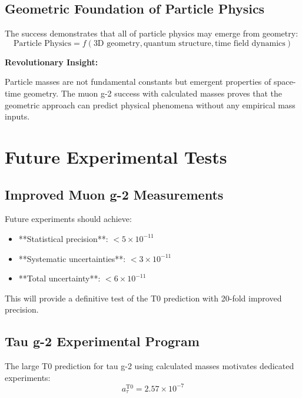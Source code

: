 \documentclass[12pt,a4paper]{article}
\numberwithin{equation}{section}
\begin{document}
	\subsection{Geometric Foundation of Particle Physics}
	
	The success demonstrates that all of particle physics may emerge from geometry:
	\begin{equation}
		\text{Particle Physics} = f(\text{3D geometry}, \text{quantum structure}, \text{time field dynamics})
	\end{equation}
	
	\begin{t0important}
		\textbf{Revolutionary Insight:}
		
		Particle masses are not fundamental constants but emergent properties of space-time geometry. The muon g-2 success with calculated masses proves that the geometric approach can predict physical phenomena without any empirical mass inputs.
	\end{t0important}
	
	\section{Future Experimental Tests}
	
	\subsection{Improved Muon g-2 Measurements}
	
	Future experiments should achieve:
	\begin{itemize}
		\item **Statistical precision**: $< 5 \times 10^{-11}$
		\item **Systematic uncertainties**: $< 3 \times 10^{-11}$
		\item **Total uncertainty**: $< 6 \times 10^{-11}$
	\end{itemize}
	
	This will provide a definitive test of the T0 prediction with 20-fold improved precision.
	
	\subsection{Tau g-2 Experimental Program}
	
	The large T0 prediction for tau g-2 using calculated masses motivates dedicated experiments:
	\begin{equation}
		a_\tau^{\text{T0}} = 2.57 \times 10^{-7}
	\end{equation}
	
\end{document}

